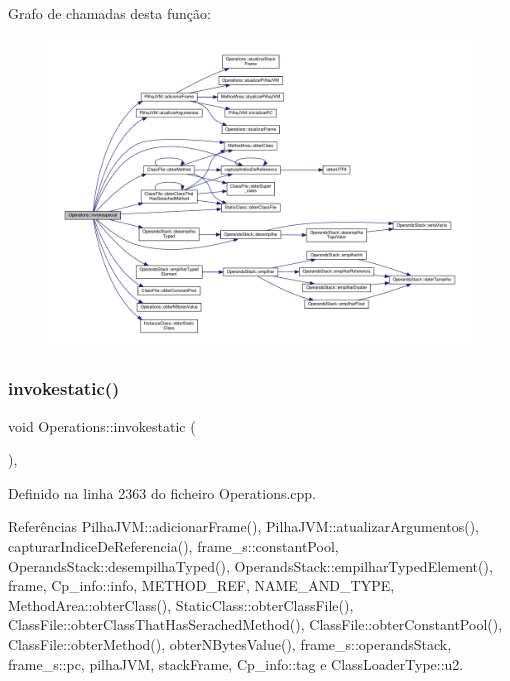 Grafo de chamadas desta função\+:
\nopagebreak
\begin{figure}[H]
\begin{center}
\leavevmode
\includegraphics[width=350pt]{classOperations_ab561e27c8450ceec7e4f8b0a155fcda3_cgraph}
\end{center}
\end{figure}
\mbox{\label{classOperations_a562d8c9cc5975de2ee6d1a95e1969724}} 
\subsubsection{\texorpdfstring{invokestatic()}{invokestatic()}}
{\footnotesize\ttfamily void Operations\+::invokestatic (\begin{DoxyParamCaption}{ }\end{DoxyParamCaption})\hspace{0.3cm}{\ttfamily [static]}, {\ttfamily [private]}}



Definido na linha 2363 do ficheiro Operations.\+cpp.



Referências Pilha\+J\+V\+M\+::adicionar\+Frame(), Pilha\+J\+V\+M\+::atualizar\+Argumentos(), capturar\+Indice\+De\+Referencia(), frame\+\_\+s\+::constant\+Pool, Operands\+Stack\+::desempilha\+Typed(), Operands\+Stack\+::empilhar\+Typed\+Element(), frame, Cp\+\_\+info\+::info, M\+E\+T\+H\+O\+D\+\_\+\+R\+EF, N\+A\+M\+E\+\_\+\+A\+N\+D\+\_\+\+T\+Y\+PE, Method\+Area\+::obter\+Class(), Static\+Class\+::obter\+Class\+File(), Class\+File\+::obter\+Class\+That\+Has\+Serached\+Method(), Class\+File\+::obter\+Constant\+Pool(), Class\+File\+::obter\+Method(), obter\+N\+Bytes\+Value(), frame\+\_\+s\+::operands\+Stack, frame\+\_\+s\+::pc, pilha\+J\+VM, stack\+Frame, Cp\+\_\+info\+::tag e Class\+Loader\+Type\+::u2.

